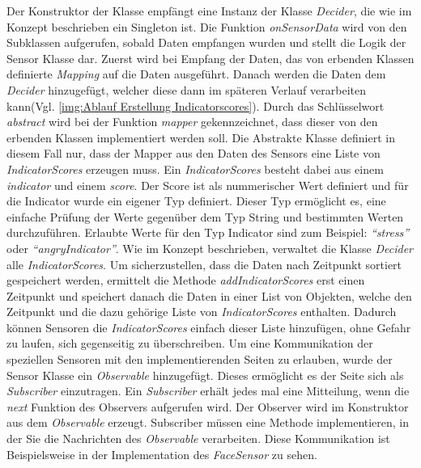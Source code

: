Der Konstruktor der Klasse empfängt eine Instanz der Klasse \textit{Decider}, die wie im Konzept beschrieben ein Singleton ist. Die Funktion \textit{onSensorData} wird von den Subklassen aufgerufen, sobald Daten empfangen wurden und stellt die Logik der Sensor Klasse dar. Zuerst wird bei Empfang der Daten, das von erbenden Klassen definierte \textit{Mapping} auf die Daten ausgeführt. Danach werden die Daten dem \textit{Decider} hinzugefügt, welcher diese dann im späteren Verlauf verarbeiten kann(Vgl. \ref{img:Ablauf Erstellung Indicatorscores}). Durch das Schlüsselwort \textit{abstract} wird bei der Funktion \textit{mapper} gekennzeichnet, dass dieser von den erbenden Klassen implementiert werden soll. Die Abstrakte Klasse definiert in diesem Fall nur, dass der Mapper aus den Daten des Sensors eine Liste von \textit{IndicatorScores} erzeugen muss. Ein \textit{IndicatorScores} besteht dabei aus einem \textit{indicator} und einem \textit{score}. Der Score ist als nummerischer Wert definiert und für die Indicator wurde ein eigener Typ definiert. Dieser Typ ermöglicht es, eine einfache Prüfung der Werte gegenüber dem Typ String und bestimmten Werten durchzuführen. Erlaubte Werte für den Typ Indicator sind zum Beispiel: \textit{``stress''} oder \textit{``angryIndicator''}.\newline
Wie im Konzept beschrieben, verwaltet die Klasse \textit{Decider} alle \textit{IndicatorScores}. Um sicherzustellen, dass die Daten nach Zeitpunkt sortiert gespeichert werden, ermittelt die Methode \textit{addIndicatorScores} erst einen Zeitpunkt und speichert danach die Daten in einer List von Objekten, welche den Zeitpunkt und die dazu gehörige Liste von \textit{IndicatorScores} enthalten. Dadurch können Sensoren die \textit{IndicatorScores} einfach dieser Liste hinzufügen, ohne Gefahr zu laufen, sich gegenseitig zu überschreiben.\newline
Um eine Kommunikation der speziellen Sensoren mit den implementierenden Seiten zu erlauben, wurde der Sensor Klasse ein \textit{Observable} hinzugefügt. Dieses ermöglicht es der Seite sich als \textit{Subscriber} einzutragen. Ein \textit{Subscriber} erhält jedes mal eine Mitteilung, wenn die \textit{next} Funktion des Observers aufgerufen wird. Der Observer wird im Konstruktor aus dem \textit{Observable} erzeugt. Subscriber müssen eine Methode implementieren, in der Sie die Nachrichten des \textit{Observable} verarbeiten. Diese Kommunikation ist Beispielsweise in der Implementation des \textit{FaceSensor} zu sehen.

